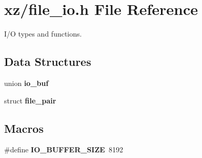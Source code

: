 \section{xz/file\+\_\+io.h File Reference}
\label{file__io_8h}


I/O types and functions.  


\subsection*{Data Structures}
\begin{DoxyCompactItemize}
\item 
union \textbf{ io\+\_\+buf}
\item 
struct \textbf{ file\+\_\+pair}
\end{DoxyCompactItemize}
\subsection*{Macros}
\begin{DoxyCompactItemize}
\item 
\mbox{\label{file__io_8h_abe5d3c90538920357e5f36e108e5dcaa}} 
\#define {\bfseries I\+O\+\_\+\+B\+U\+F\+F\+E\+R\+\_\+\+S\+I\+ZE}~8192
\end{DoxyCompactItemize}

